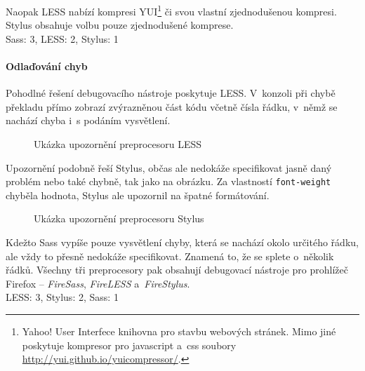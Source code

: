 \documentclass[thesis=B,czech]{FITthesis}[2012/06/26]
\begin{document}
Naopak LESS nabízí kompresi YUI\footnote{Yahoo! User Interfece knihovna pro stavbu webových stránek. Mimo jiné poskytuje kompresor pro javascript a~css soubory \url{http://yui.github.io/yuicompressor/}.} či svou vlastní zjednodušenou kompresi. Stylus obsahuje volbu pouze zjednodušené komprese.\\
\gls{Sass}: 3, LESS: 2, Stylus: 1

\paragraph{Odlaďování chyb}

Pohodlné řešení debugovacího nástroje poskytuje LESS. V~konzoli při chybě překladu přímo zobrazí zvýrazněnou část kódu včetně čísla řádku, v~němž se nachází chyba i~s podáním vysvětlení. 

\begin{figure}[htb]
	\begin{center}
	\end{center}
	\caption{Ukázka upozornění preprocesoru LESS}
	\label{imgLESS1}
\end{figure}
Upozornění podobně řeší Stylus, občas ale nedokáže specifikovat jasně daný problém nebo také chybně, tak jako na obrázku. Za vlastností \verb#font-weight# chyběla hodnota, Stylus ale upozornil na špatné formátování.
\begin{figure}[h]
	\begin{center}
	\end{center}
	\caption{Ukázka upozornění preprocesoru Stylus}
	\label{imgSass1}
\end{figure}

Kdežto \gls{Sass} vypíše pouze vysvětlení chyby, která se nachází okolo určitého řádku, ale vždy to přesně nedokáže specifikovat. Znamená to, že se splete o~několik řádků. Všechny tři preprocesory pak obsahují debugovací nástroje pro prohlížeč Firefox -- \textit{FireSass}, \textit{FireLESS} a~\textit{FireStylus}.\\
LESS: 3, Stylus: 2, \gls{Sass}: 1
\end{document}
